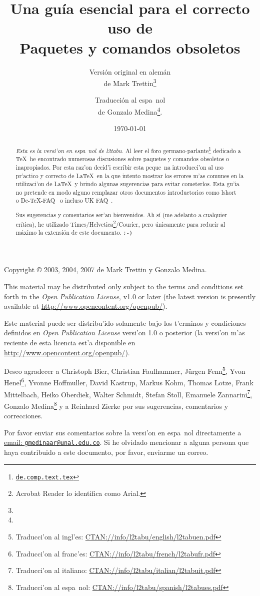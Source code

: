 \documentclass[11pt,a4paper,pagesize,tablecaptionabove,abstracton,pointlessnumbers]{scrartcl}
\title{Una gu\'ia esencial para el correcto uso de \LaTeXe\\[1em]
  \LARGE\mdseries\rmfamily Paquetes y comandos obsoletos}
\author{Versi\'on original en alem\'an\\
  de Mark Trettin\thanks{\EMail{Mark.Trettin@gmx.de}}%
  \and
  Traducci\'on al espa~nol\\
  de Gonzalo Medina\thanks{\EMail{gmedinaar@unal.edu.co}}.}
\date{\today}
\newcommand{\TimesRant}{Ah s\'i (me adelanto a cualquier cr\'itica), he utilizado Times/Helvetica\footnote{Acrobat Reader lo identifica como Arial.}/Courier, pero \'unicamente para reducir al m\'aximo la extensi\'on de este documento. \texttt{;-)}}
\newcommand{\EMail}[1]{\href{mailto:#1?Subject=[l2tabu.pdf]}{email: \texttt{#1}}}
\newcommand{\News}[1]{\href{news:#1}{\texttt{#1}}}
\newcommand{\EMail}[1]{\href{mailto:#1}{Email: \texttt{#1}}}
\newcommand{\News}[1]{\href{news:#1}{\texttt{#1}}}
\newcommand{\gl}{\guillemotleft}
\newcommand{\gr}{\guillemotright}
\newcommand{\Doku}[1]{\textsf{#1}\xspace}
\begin{document}
\pagestyle{headings}
\maketitle
\begin{abstract}
  \noindent
  \emph{Esta es la versi'on en espa~nol de l2tabu.}  Al leer el foro germano-parlante\footnote{\News{de.comp.text.tex}} dedicado a \TeX\ he encontrado numerosas discusiones sobre paquetes y comandos obsoletos o \gl inapropiados\gr. Por esta raz'on decid'i escribir esta peque~na introducci'on al uso pr'actico y correcto de \LaTeX\ en la que intento mostrar los errores m'as comunes en la utilizaci'on de \LaTeX\ y brindo algunas sugerencias para evitar cometerlos. 
  Esta gu'ia no pretende en modo alguno remplazar otros documentos introductorios como \Doku{lshort}~\cite{l2kurz:99} o \Doku{De-TeX-FAQ}~\cite[version 72]{faq:02} o incluso \Doku{UK FAQ}~\cite[version 3.9]{ukfaq:99}.

  Sus sugerencias y comentarios ser'an bienvenidos. \TimesRant
\end{abstract}

{\setlength{\parindent}{0pt}
  \footnotesize
\vfill
Copyright \copyright{} 2003, 2004, 2007 de Mark Trettin y Gonzalo Medina.
\medskip

This material may be distributed only subject to the terms and conditions set
forth in the \emph{Open Publication License}, v1.0 or later (the latest
version is presently available at \url{http://www.opencontent.org/openpub/}).

Este material puede ser distribu'ido solamente bajo los t'erminos y condiciones definidos en \emph{Open Publication License} versi'on 1.0 o posterior (la versi'on m'as reciente de esta licencia est'a disponible en\\ \url{http://www.opencontent.org/openpub/}).

\bigskip

Deseo agradecer a
Christoph Bier,
Christian Faulhammer,
Jürgen Fenn\footnote{Traducci'on al ingl'es: \url{CTAN://info/l2tabu/english/l2tabuen.pdf}},
Yvon Henel\footnote{Traducci'on al franc'es: \url{CTAN://info/l2tabu/french/l2tabufr.pdf}},
Yvonne Hoffmuller,
David Kastrup,
Markus Kohm,
Thomas Lotze,
Frank Mittelbach,
Heiko Oberdiek,
Walter Schmidt,
Stefan Stoll, 
Emanuele Zannarini\footnote{Traducci'on al italiano: \url{CTAN://info/l2tabu/italian/l2tabuit.pdf}},
Gonzalo Medina\footnote{Traducci'on al espa~nol: \url{CTAN://info/l2tabu/spanish/l2tabues.pdf}}
y a
Reinhard Zierke
por sus sugerencias, comentarios y correcciones.

Por favor enviar sus comentarios sobre la versi'on en espa~nol directamente a  \EMail{gmedinaar@unal.edu.co}. 
Si he olvidado mencionar a alguna persona que haya contribuido a este documento, por favor, enviarme un correo.}\par
\end{document}
